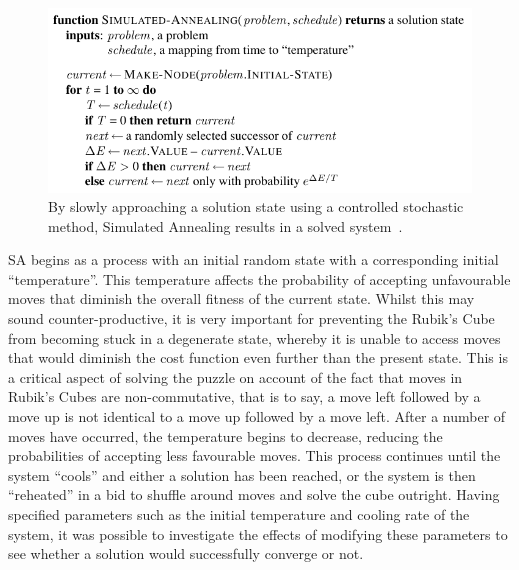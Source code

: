 \documentclass[UKenglish]{svproc}
\begin{document}
\begin{figure}[!h]
\begin{small}
\centering
\linespread{1.0}
\includegraphics[width=0.9\linewidth]{images/simulated-annealing}
\caption{By slowly approaching a solution state using a controlled stochastic method, Simulated Annealing results in a solved system~\cite{10.5555/1671238}.}
\label{fig:fig1}
\end{small}
\end{figure}

SA begins as a process with an initial random state with a corresponding initial ``temperature''. This temperature affects the probability of accepting unfavourable moves that diminish the overall fitness of the current state. Whilst this may sound counter-productive, it is very important for preventing the Rubik's Cube from becoming stuck in a degenerate state, whereby it is unable to access moves that would diminish the cost function even further than the present state. This is a critical aspect of solving the puzzle on account of the fact that moves in Rubik's Cubes are non-commutative, that is to say, a move left followed by a move up is not identical to a move up followed by a move left. After a number of moves have occurred, the temperature begins to decrease, reducing the probabilities of accepting less favourable moves. This process continues until the system ``cools'' and either a solution has been reached, or the system is then ``reheated'' in a bid to shuffle around moves and solve the cube outright. Having specified parameters such as the initial temperature and cooling rate of the system, it was possible to investigate the effects of modifying these parameters to see whether a solution would successfully converge or not.

\end{document}
